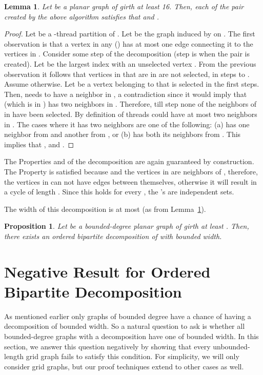 \documentclass[11pt]{article}
\newtheorem{lemma}[theorem]{Lemma}
\newtheorem{proposition}[theorem]{Proposition}
\begin{document}
\begin{lemma} \label{planarf}
Let  be a planar graph of girth at least 16. Then, each of the  pair created by the above algorithm satisfies that  and .
\end{lemma}
\begin{proof}

Let  be a -thread partition of .   Let  be the graph induced by   on . The first observation is that a vertex in any  () has at most one edge connecting it to the vertices in . Consider some step  of the decomposition (step  is when the  pair is created). Let  be the largest index with an unselected vertex .  From the previous observation it follows that vertices in  that are in  are not selected, in steps  to . Assume otherwise. Let  be a vertex belonging to  that is  selected in the first  steps. Then,  needs to have a neighbor in , a contradiction since it would imply that  (which is in ) has two neighbors in . Therefore, till step  none of the neighbors of  in  have been selected.  By definition of threads  could have at most two neighbors in . The cases where it has two neighbors are one of the following: (a)  has one neighbor from  and another from , or (b)  has both its neighbors from . This implies that , and .
\end{proof}
The Properties  and  of the decomposition are again guaranteed by construction. The Property  is satisfied because  and the vertices in  are neighbors of , therefore, the vertices in  can not have edges between themselves, otherwise it will result in a cycle of length . Since this holds for every , the 's are independent sets. 

The width of this decomposition is at most  (as  from Lemma~\ref{planarf}).

\begin{proposition} \label{prop:5}
Let  be a bounded-degree planar graph of girth at least . Then, there exists an ordered bipartite decomposition of  with bounded width.
\end{proposition}

\section{Negative Result for Ordered Bipartite Decomposition} \label{neg}
As mentioned earlier only graphs of bounded degree have a chance of having a decomposition of bounded width. So a natural question to ask is whether all bounded-degree graphs with a decomposition have one of bounded width. In this section, we answer this question negatively by showing that every unbounded-length grid graph fails to satisfy this condition.  For simplicity, we will only consider  grid graphs, but our proof techniques extend to other cases as well. 
\end{document}
